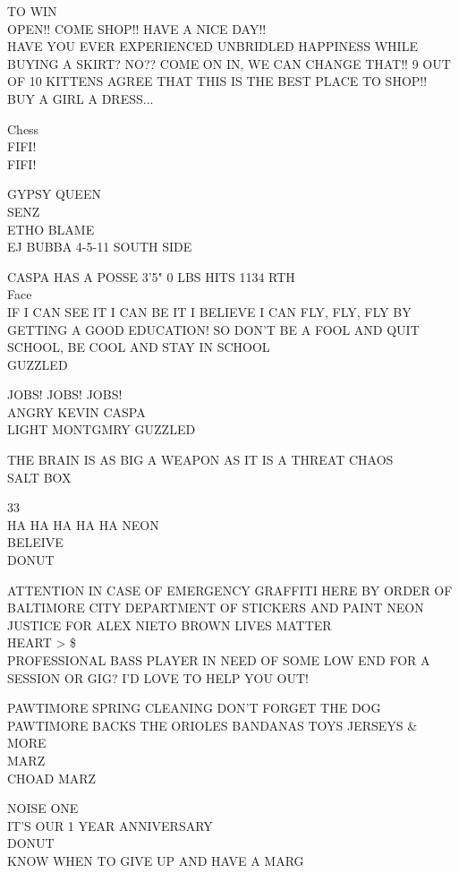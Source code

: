 \documentclass[10pt,letterpaper]{article}
\begin{document}
TO WIN\\
OPEN!!  COME SHOP!!  HAVE A NICE DAY!!\\
HAVE YOU EVER EXPERIENCED UNBRIDLED HAPPINESS WHILE BUYING A SKIRT?  NO??  COME ON IN, WE CAN CHANGE THAT!!  9 OUT OF 10 KITTENS AGREE THAT THIS IS THE BEST PLACE TO SHOP!!\\
BUY A GIRL A DRESS...

Chess\\
FIFI!\\
FIFI!

GYPSY QUEEN\\
SENZ\\
ETHO BLAME\\
EJ BUBBA 4{-}5{-}11 SOUTH SIDE

CASPA HAS A POSSE 3'5" 0 LBS HITS 1134 RTH\\
Face\\
IF I CAN SEE IT I CAN BE IT I BELIEVE I CAN FLY, FLY, FLY BY GETTING A GOOD EDUCATION!  SO DON'T BE A FOOL AND QUIT SCHOOL, BE COOL AND STAY IN SCHOOL\\
GUZZLED

JOBS!  JOBS!  JOBS!\\
ANGRY KEVIN CASPA\\
LIGHT MONTGMRY GUZZLED

THE BRAIN IS AS BIG A WEAPON AS IT IS A THREAT CHAOS\\
SALT BOX

33\\
HA HA HA HA HA NEON\\
BELEIVE\\
DONUT

ATTENTION IN CASE OF EMERGENCY GRAFFITI HERE BY ORDER OF BALTIMORE CITY DEPARTMENT OF STICKERS AND PAINT NEON\\
JUSTICE FOR ALEX NIETO BROWN LIVES MATTER\\
HEART > \$\\
PROFESSIONAL BASS PLAYER IN NEED OF SOME LOW END FOR A SESSION OR GIG?  I'D LOVE TO HELP YOU OUT!

PAWTIMORE SPRING CLEANING DON'T FORGET THE DOG\\
PAWTIMORE BACKS THE ORIOLES BANDANAS TOYS JERSEYS \& MORE\\
MARZ\\
CHOAD MARZ

NOISE ONE\\
IT'S OUR 1 YEAR ANNIVERSARY\\
DONUT\\
KNOW WHEN TO GIVE UP AND HAVE A MARG
\end{document}
